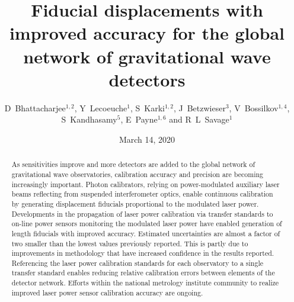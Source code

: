 \documentclass[12pt,a4paper,final]{iopart}
\begin{document}
\title[]{Fiducial displacements with improved accuracy for the global network of gravitational wave detectors}
%
%
\author{D~Bhattacharjee$^{1,2}$, Y~Lecoeuche$^1$, S~Karki$^{1,2}$, J~Betzwieser$^3$, V~Bossilkov$^{1,4}$, S~Kandhasamy$^5$,  E~Payne$^{1,6}$ and R~L~Savage$^1$}
\address{$^1$ LIGO Hanford Observatory, Richland, WA 99352 USA}
\address{$^2$ Institute of Multi-messenger Astrophysics and Cosmology, Missouri University of Science and Technology, Rolla, MO 65409 USA }
\address{$^3$ LIGO Livingston Observatory, Livingston, LA 70754 USA}
\address{$^4$ The University of Western Australia, Crawley WA 60069, Australia}
\address{$^5$ Inter-University Centre for Astronomy and Astrophysics, Pune-411007, India}
\address{$^6$ OzGrav, School of Physics \& Astronomy, Monash University, Clayton  VIC 3800, Australia}
\date{March 14, 2020}
%
\setcounter{footnote}{6}
\begin{abstract}
As sensitivities improve and more detectors are added to the global network of gravitational wave observatories, calibration accuracy and precision are becoming increasingly important.  Photon calibrators, relying on power-modulated auxiliary laser beams reflecting from suspended interferometer optics, enable continuous calibration by generating  displacement fiducials proportional to the modulated laser power.    Developments in the propagation of laser power calibration via transfer standards to on-line power sensors monitoring the modulated laser power have enabled generation of length fiducials with improved accuracy.  Estimated uncertainties are almost a factor of two smaller than the lowest values previously reported.  This is partly due to improvements in methodology that have increased confidence in the results reported.  Referencing the laser power calibration standards for each observatory to a single transfer standard enables reducing relative calibration errors between elements of the detector network. Efforts within the national metrology institute community to realize improved laser power sensor calibration accuracy are ongoing.
\end{abstract}
%
\submitto{\CQG}
%
\end{document}
